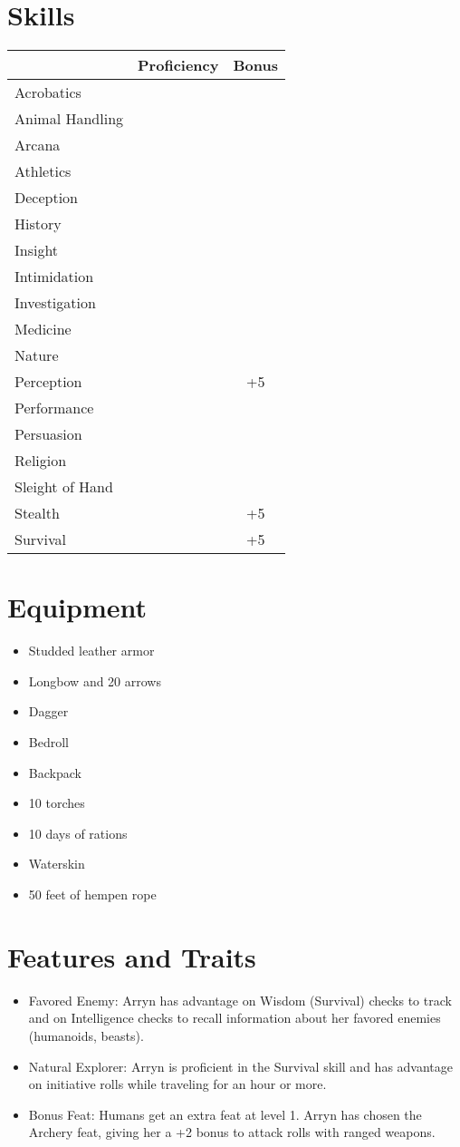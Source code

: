 \documentclass[12pt]{article}
\begin{document}
\section{Skills}
\begin{tabularx}{\linewidth}{lcc}
\toprule
& \textbf{Proficiency} & \textbf{Bonus} \\
\midrule
Acrobatics &  &  \\
Animal Handling &  &  \\
Arcana &  &  \\
Athletics &  &  \\
Deception &  &  \\
History &  &  \\
Insight &  &  \\
Intimidation &  &  \\
Investigation &  &  \\
Medicine &  &  \\
Nature &  &  \\
Perception &  & +5 \\
Performance &  &  \\
Persuasion &  &  \\
Religion &  &  \\
Sleight of Hand &  &  \\
Stealth &  & +5 \\
Survival &  & +5 \\
\bottomrule
\end{tabularx}

\section{Equipment}
\begin{itemize}[leftmargin=*]
\item Studded leather armor
\item Longbow and 20 arrows
\item Dagger
\item Bedroll
\item Backpack
\item 10 torches
\item 10 days of rations
\item Waterskin
\item 50 feet of hempen rope
\end{itemize}
\section{Features and Traits}
\begin{itemize}[leftmargin=*]
\item Favored Enemy: Arryn has advantage on Wisdom (Survival) checks to track and on Intelligence checks to recall information about her favored enemies (humanoids, beasts).
\item Natural Explorer: Arryn is proficient in the Survival skill and has advantage on initiative rolls while traveling for an hour or more.
\item Bonus Feat: Humans get an extra feat at level 1. Arryn has chosen the Archery feat, giving her a +2 bonus to attack rolls with ranged weapons.
\end{itemize}
\end{document}
